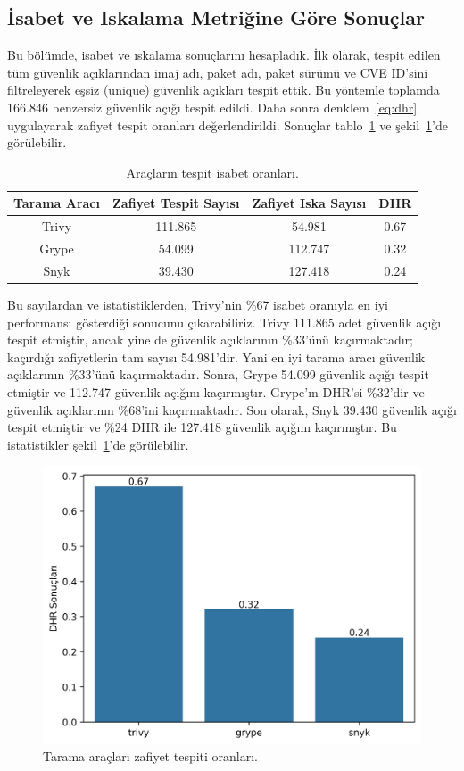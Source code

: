 \subsection{İsabet ve Iskalama Metriğine Göre Sonuçlar}\label{subsec:ResultsbyHitandMissMetric}

Bu bölümde, isabet ve ıskalama sonuçlarını hesapladık. İlk olarak, tespit edilen tüm güvenlik açıklarından imaj adı, paket adı, paket sürümü ve CVE ID'sini filtreleyerek eşsiz (unique) güvenlik açıkları tespit ettik. Bu yöntemle toplamda 166.846 benzersiz güvenlik açığı tespit edildi. Daha sonra denklem~\ref{eq:dhr} uygulayarak zafiyet tespit oranları değerlendirildi. Sonuçlar tablo~\ref{tab:hit-and-miss} ve şekil~\ref{fig:hit-and-miss}'de görülebilir.

\begin{table}[!htbp]
    \caption{Araçların tespit isabet oranları.}\label{tab:hit-and-miss}
    \centering
    \begin{tabular}{ |c|c|c|c| }
        \hline
        Tarama Aracı & Zafiyet Tespit Sayısı & Zafiyet Iska Sayısı & DHR \\
        \hline
        Trivy & 111.865 &  54.981 & 0.67 \\
        Grype &  54.099 & 112.747 & 0.32 \\
        Snyk  &  39.430 & 127.418 & 0.24 \\
        \hline
    \end{tabular}
\end{table}

Bu sayılardan ve istatistiklerden, Trivy'nin \%67 isabet oranıyla en iyi performansı gösterdiği sonucunu çıkarabiliriz. Trivy 111.865 adet güvenlik açığı tespit etmiştir, ancak yine de güvenlik açıklarının \%33'ünü kaçırmaktadır; kaçırdığı zafiyetlerin tam sayısı 54.981'dir. Yani en iyi tarama aracı güvenlik açıklarının \%33'ünü kaçırmaktadır. Sonra, Grype 54.099 güvenlik açığı tespit etmiştir ve 112.747 güvenlik açığını kaçırmıştır. Grype'ın DHR'si \%32'dir ve güvenlik açıklarının \%68'ini kaçırmaktadır. Son olarak, Snyk 39.430 güvenlik açığı tespit etmiştir ve \%24 DHR ile 127.418 güvenlik açığını kaçırmıştır. Bu istatistikler şekil~\ref{fig:hit-and-miss}'de görülebilir.

\begin{figure}[!htbp]
    \centering
    \includegraphics[width=.8\linewidth]{images/s1/DHR.png}
    \caption{Tarama araçları zafiyet tespiti oranları.}\label{fig:hit-and-miss}
\end{figure}

